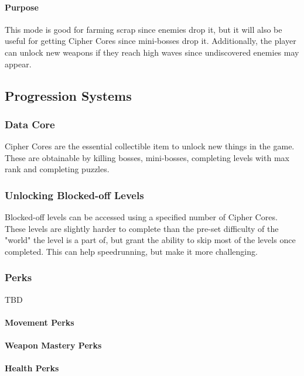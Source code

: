 \documentclass[12pt]{article}
\begin{document}
\paragraph{Purpose}

This mode is good for farming scrap since enemies drop it, but it will also be useful for getting Cipher Cores since mini-bosses drop it. Additionally, the player can unlock new weapons if they reach high waves since undiscovered enemies may appear.

\subsection{Progression Systems}

\subsubsection{Data Core}

Cipher Cores are the essential collectible item to unlock new things in the game. These are obtainable by killing bosses, mini-bosses, completing levels with max rank and completing puzzles. 

\subsubsection{Unlocking Blocked-off Levels}

Blocked-off levels can be accessed using a specified number of Cipher Cores. These levels are slightly harder to complete than the pre-set difficulty of the "world" the level is a part of, but grant the ability to skip most of the levels once completed. This can help speedrunning, but make it more challenging. 

\subsubsection{Perks}

TBD

\paragraph{Movement Perks}

\paragraph{Weapon Mastery Perks}

\paragraph{Health Perks}
\end{document}
